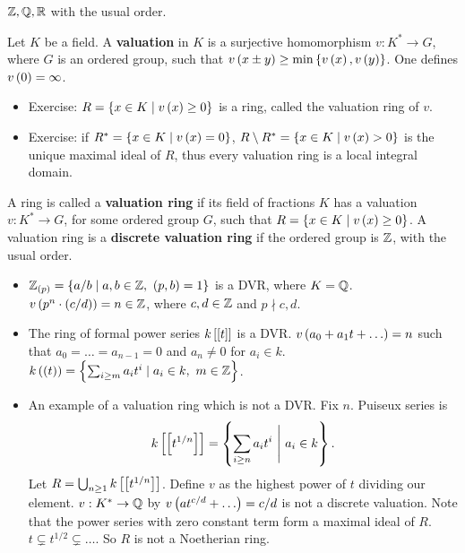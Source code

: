 \begin{example*}
$ \Z, \Q, \R $ with the usual order.
\end{example*}

\begin{definition}
Let $ K $ be a field. A \textbf{valuation} in $ K $ is a surjective homomorphism $ v : K^* \to G $, where $ G $ is an ordered group, such that $ v\rb{x \pm y} \ge \min\cb{v\rb{x}, v\rb{y}} $. One defines $ v\rb{0} = \infty $.
\begin{itemize}
\item Exercise: $ R = \cb{x \in K \mid v\rb{x} \ge 0} $ is a ring, called the valuation ring of $ v $.
\item Exercise: if $ R^* = \cb{x \in K \mid v\rb{x} = 0} $, $ R \setminus R^* = \cb{x \in K \mid v\rb{x} > 0} $ is the unique maximal ideal of $ R $, thus every valuation ring is a local integral domain.
\end{itemize}
\end{definition}

\begin{definition}
A ring is called a \textbf{valuation ring} if its field of fractions $ K $ has a valuation $ v : K^* \to G $, for some ordered group $ G $, such that $ R = \cb{x \in K \mid v\rb{x} \ge 0} $. A valuation ring is a \textbf{discrete valuation ring} if the ordered group is $ \Z $, with the usual order.
\end{definition}

\pagebreak

\begin{example*}
\hfill
\begin{itemize}
\item $ \Z_{\rb{p}} = \cb{a / b \mid a, b \in \Z, \ \rb{p, b} = 1} $ is a DVR, where $ K = \Q $. $ v\rb{p^n \cdot \rb{c / d}} = n \in \Z $, where $ c, d \in \Z $ and $ p \nmid c, d $.
\item The ring of formal power series $ k\sb{\sb{t}} $ is a DVR. $ v\rb{a_0 + a_1t + \dots} = n $ such that $ a_0 = \dots = a_{n - 1} = 0 $ and $ a_n \ne 0 $ for $ a_i \in k $. $ k\rb{\rb{t}} = \cb{\sum_{i \ge m} a_it^i \mid a_i \in k, \ m \in \Z} $.
\item An example of a valuation ring which is not a DVR. Fix $ n $. Puiseux series is
$$ k\sb{\sb{t^{1 / n}}} = \cb{\sum_{i \ge n} a_it^i \ \Bigg| \ a_i \in k}. $$
Let $ R = \bigcup_{n \ge 1} k\sb{\sb{t^{1 / n}}} $. Define $ v $ as the highest power of $ t $ dividing our element. $ v : K^* \to \Q $ by $ v\rb{at^{c / d} + \dots} = c / d $ is not a discrete valuation. Note that the power series with zero constant term form a maximal ideal of $ R $. $ t \subsetneq t^{1 / 2} \subsetneq \dots $. So $ R $ is not a Noetherian ring.
\end{itemize}
\end{example*}

